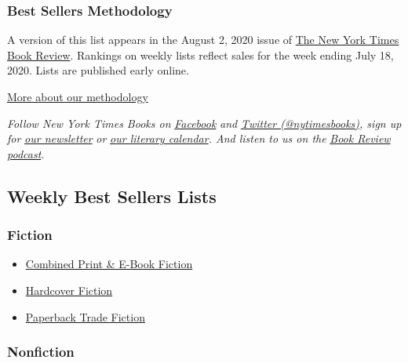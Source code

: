\hypertarget{best-sellers-methodology}{%
\subsubsection{Best Sellers
Methodology}\label{best-sellers-methodology}}

A version of this list appears in the August 2, 2020 issue of
\href{http://www.nytimes3xbfgragh.onion/section/books/review}{The New
York Times Book Review}. Rankings on weekly lists reflect sales for the
week ending July 18, 2020. Lists are published early online.

\href{/books/best-sellers/methodology/}{More about our methodology}

\emph{Follow New York Times Books on}
\href{https://www.facebookcorewwwi.onion/nytbooks/}{\emph{Facebook}}
\emph{and} \href{https://twitter.com/nytimesbooks}{\emph{Twitter
(@nytimesbooks)}}\emph{, sign up for}
\href{https://www.nytimes3xbfgragh.onion/newsletters/books-review}{\emph{our
newsletter}} \emph{or}
\href{https://www.nytimes3xbfgragh.onion/interactive/2017/books/books-calendar.html}{\emph{our
literary calendar}}\emph{. And listen to us on the}
\href{https://www.nytimes3xbfgragh.onion/column/book-review-podcast}{\emph{Book
Review podcast}}\emph{.}

\hypertarget{weekly-best-sellers-lists}{%
\subsection{Weekly Best Sellers Lists}\label{weekly-best-sellers-lists}}

\hypertarget{fiction}{%
\subsubsection{Fiction}\label{fiction}}

\begin{itemize}
\tightlist
\item
  \href{/books/best-sellers/2020/08/02/combined-print-and-e-book-fiction/}{Combined
  Print \& E-Book Fiction}
\item
  \href{/books/best-sellers/2020/08/02/hardcover-fiction/}{Hardcover
  Fiction}
\item
  \href{/books/best-sellers/2020/08/02/trade-fiction-paperback/}{Paperback
  Trade Fiction}
\end{itemize}

\hypertarget{nonfiction}{%
\subsubsection{Nonfiction}\label{nonfiction}}


